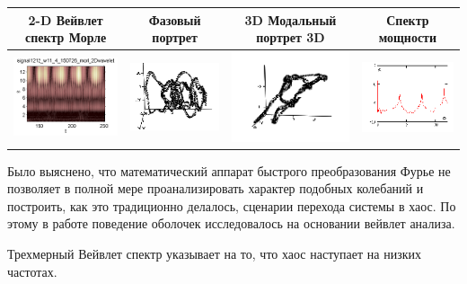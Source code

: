\documentclass[12pt,letterpaper]{extreport}
\begin{document}
\begin{table}[H]
{\begin{tabular}{|c|c|c|c|}
\hline
\footnotesize 2-D Вейвлет спектр Морле&\footnotesize Фазовый портрет&\footnotesize 3D	Модальный портрет 3D&\footnotesize Спектр мощности\\
\hline
	\includegraphics[scale=0.9]{e1} 	
	&	
	\includegraphics[scale=0.9]{e2} 	
	&	
	\includegraphics[scale=0.9]{e3} 
	&
	\includegraphics[scale=0.9]{e4} 
\\
\hline
\end{tabular}

}
\end{table}	
\par Было выяснено, что математический аппарат быстрого преобразования Фурье не позволяет в полной мере проанализировать характер подобных колебаний и построить, как это традиционно делалось, сценарии перехода системы в хаос. По этому в работе поведение оболочек исследовалось на основании вейвлет анализа.
\par Трехмерный Вейвлет спектр указывает на то, что хаос наступает на низких частотах.
\end{document}
